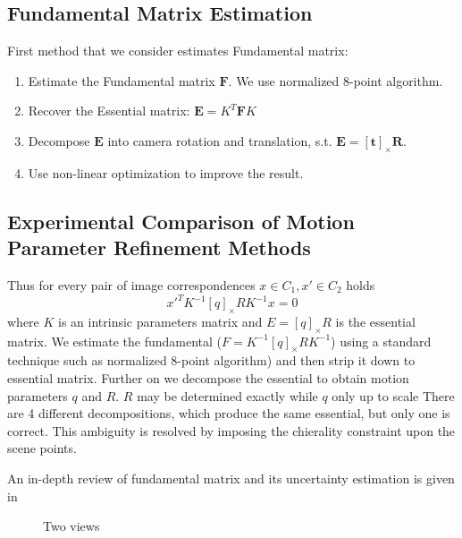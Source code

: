 \documentclass[10pt]{article}         %
\begin{document}
\subsection{Fundamental Matrix Estimation}
First method that we consider estimates Fundamental matrix:
\begin{enumerate}
\item Estimate the Fundamental matrix $\mathbf{F}$. We use normalized 8-point algorithm.
\item Recover the Essential matrix: $\mathbf{E} = K^T\mathbf{F}K$
\item Decompose $\mathbf{E}$ into camera rotation and translation, s.t. $\mathbf{E} = [\mathbf{t}]_\times\mathbf{R}$.
\item Use non-linear optimization to improve the result.
\end{enumerate}

\subsection{Experimental Comparison of Motion Parameter Refinement Methods}

Thus for every pair of image correspondences $x\in C_1,x'\in C_2$ holds
\[
x'^TK^{-1}[q]_{\times}RK^{-1}x=0
\]
where $K$ is an intrinsic parameters matrix and $E=[q]_{\times}R$ is
the essential matrix.  We estimate the fundamental
($F=K^{-1}[q]_{\times}RK^{-1}$) using a standard technique such as
normalized 8-point algorithm) and then strip it down to essential
matrix.  Further on we decompose the essential to obtain motion
parameters $q$ and $R$.  $R$ may be determined exactly while $q$ only
up to scale There are 4 different decompositions, which produce the
same essential, but only one is correct.  This ambiguity is resolved
by imposing the chierality constraint upon the scene points.

An in-depth review of fundamental matrix and its uncertainty
estimation is given in ~\cite{zhang1998determining}

\begin{figure}[!h]
  \centering
  \caption{Two views}
  \label{fig:two_views}
\end{figure}
\end{document}
